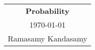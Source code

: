 



\raggedright
\footnotesize
\begin{multicols*}{3}
\setlength{\premulticols}{1pt}
\setlength{\postmulticols}{1pt}
\setlength{\multicolsep}{1pt}
\setlength{\columnsep}{2pt}

\begin{center}
\begin{tabular}{c}
\LARGE{\textbf{Probability}}\\
\today\\
Ramasamy Kandasamy\\
\end{tabular}
\end{center}




\end{multicols*}
